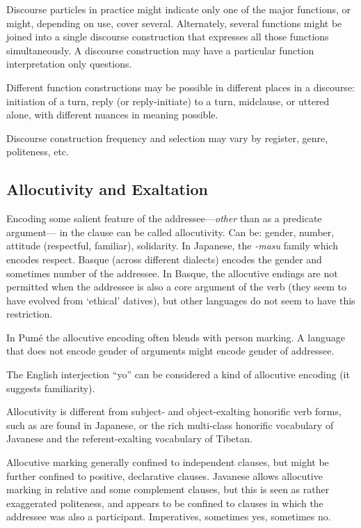 \documentclass[11pt]{article}
\begin{document}
Discourse particles in practice might indicate only one of the major
functions, or might, depending on use, cover several.  Alternately,
several functions might be joined into a single discourse construction
that expresses all those functions simultaneously.  A discourse
construction may have a particular function interpretation only
questions.

Different function constructions may be possible in different places
in a discourse: initiation of a turn, reply (or reply-initiate) to a
turn, midclause, or uttered alone, with different nuances in meaning
possible. 

Discourse construction frequency and selection may vary by register,
genre, politeness, etc. 

\subsection{Allocutivity and Exaltation} Encoding some salient feature
of the addressee---\textit{other} than as a predicate argument--- in
the clause can be called allocutivity.  Can be: gender, number,
attitude (respectful, familiar), solidarity.  In Japanese, the
\textit{-masu} family which encodes respect.  Basque (across different
dialects) encodes the gender and sometimes number of the addressee.
In Basque, the allocutive endings are not permitted when the addressee
is also a core argument of the verb (they seem to have evolved from
`ethical' datives), but other languages do not seem to have this
restriction.

In Pumé the allocutive encoding often blends with person marking.  A
language that does not encode gender of arguments might encode gender
of addressee.

The English interjection ``yo'' can be considered a kind of allocutive
encoding (it suggests familiarity).

Allocutivity is different from subject- and object-exalting honorific
verb forms, such as are found in Japanese, or the rich multi-class
honorific vocabulary of Javanese and the referent-exalting vocabulary
of Tibetan.

Allocutive marking generally confined to independent clauses, but
might be further confined to positive, declarative clauses.  Javanese
allows allocutive marking in relative and some complement clauses, but
this is seen as rather exaggerated politeness, and appears to be
confined to clauses in which the addressee was also a participant.
Imperatives, sometimes yes, sometimes no.
\end{document}
